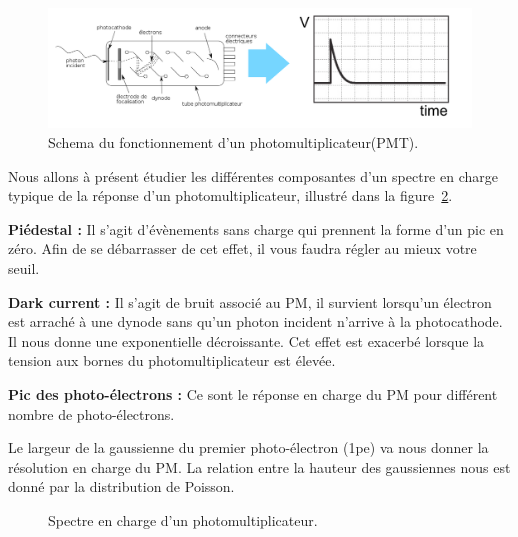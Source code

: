 \begin{figure}
    \centering
	\includegraphics[width=\textwidth]{figures/PMT_readout.png}
    \caption{Schema du fonctionnement d'un photomultiplicateur(PMT).}
    \label{fig:PMT_readout} 
\end{figure}

Nous allons à présent étudier les différentes composantes d'un spectre en charge typique de la réponse d'un photomultiplicateur, illustré dans la figure~\ref{fig:spectre}.

\textbf{Piédestal :} Il s'agit d'évènements sans charge qui prennent la forme d'un pic en zéro. Afin de se débarrasser de cet effet, il vous faudra régler au mieux votre seuil.

\textbf{Dark current :} Il s'agit de bruit associé au PM, il survient lorsqu'un électron est arraché à une dynode sans qu'un photon incident n'arrive à la photocathode. Il nous donne une exponentielle décroissante. Cet effet est exacerbé lorsque la tension aux bornes du photomultiplicateur est élevée.

\textbf{Pic des photo-électrons :} Ce sont le réponse en charge du PM pour différent nombre de photo-électrons.

Le largeur de la gaussienne du premier photo-électron (1pe) va nous donner la résolution en charge du PM. La relation entre la hauteur des gaussiennes nous est donné par la distribution de Poisson.

\begin{figure}
    \caption{\label{fig:spectre} Spectre en charge d'un photomultiplicateur.}
\end{figure}


